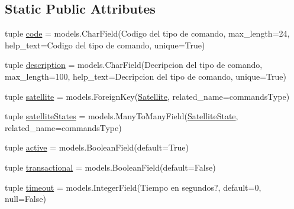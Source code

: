 \subsection*{Static Public Attributes}
\begin{DoxyCompactItemize}
\item 
tuple \hyperlink{class_ground_segment_1_1models_1_1_command_1_1_command_type_1_1_command_type_ae680169344efd4f82a2d42727944903c}{code} = models.\+Char\+Field(\textquotesingle{}Codigo del tipo de comando\textquotesingle{}, max\+\_\+length=24, help\+\_\+text=\textquotesingle{}Codigo del tipo de comando\textquotesingle{}, unique=True)
\item 
tuple \hyperlink{class_ground_segment_1_1models_1_1_command_1_1_command_type_1_1_command_type_a9b66765ef6a339ecb2b35a2761de3cd8}{description} = models.\+Char\+Field(\textquotesingle{}Decripcion del tipo de comando\textquotesingle{}, max\+\_\+length=100, help\+\_\+text=\textquotesingle{}Decripcion del tipo de comando\textquotesingle{}, unique=True)
\item 
tuple \hyperlink{class_ground_segment_1_1models_1_1_command_1_1_command_type_1_1_command_type_a5f1a3648f688f75d60bd249633967a1e}{satellite} = models.\+Foreign\+Key(\hyperlink{class_ground_segment_1_1models_1_1_satellite_1_1_satellite}{Satellite}, related\+\_\+name=\textquotesingle{}commands\+Type\textquotesingle{})
\item 
tuple \hyperlink{class_ground_segment_1_1models_1_1_command_1_1_command_type_1_1_command_type_a1b095c6f089002a371471c89d0123446}{satellite\+States} = models.\+Many\+To\+Many\+Field(\hyperlink{class_ground_segment_1_1models_1_1_satellite_state_1_1_satellite_state}{Satellite\+State}, related\+\_\+name=\textquotesingle{}commands\+Type\textquotesingle{})
\item 
tuple \hyperlink{class_ground_segment_1_1models_1_1_command_1_1_command_type_1_1_command_type_a9f270dc2d690e83cc5963c8b8e752017}{active} = models.\+Boolean\+Field(default=True)
\item 
tuple \hyperlink{class_ground_segment_1_1models_1_1_command_1_1_command_type_1_1_command_type_af3841a569f6313e9569098e30655306d}{transactional} = models.\+Boolean\+Field(default=False)
\item 
tuple \hyperlink{class_ground_segment_1_1models_1_1_command_1_1_command_type_1_1_command_type_a104872b97d971cb40619e448db6f5f16}{timeout} = models.\+Integer\+Field(\textquotesingle{}Tiempo en segundos?\textquotesingle{}, default=0, null=False)
\item 

\end{DoxyCompactItemize}

